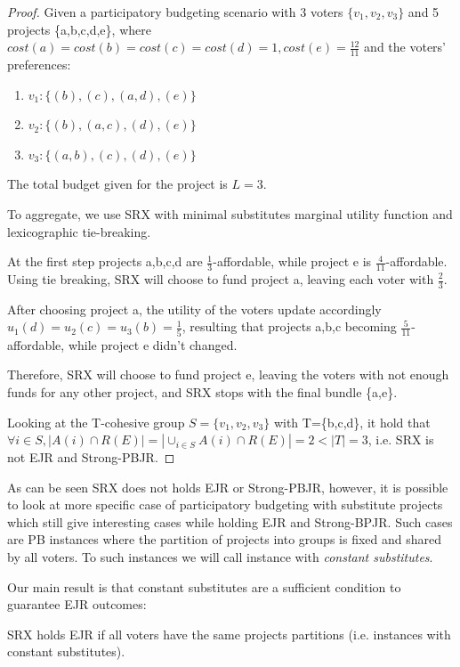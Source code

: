 \documentclass[runningheads]{llncs}
\begin{document}
\begin{proof}
Given a participatory budgeting scenario with 3 voters $\{v_1,v_2,v_3\}$ and 5 projects \{a,b,c,d,e\}, where $cost(a)=cost(b)=cost(c)=cost(d)=1, cost(e)=\frac{12}{11}$ and the voters' preferences:
\begin{enumerate}
    \item $v_1: \{(b),(c),(a,d),(e)\}$
    \item $v_2: \{(b),(a,c),(d),(e)\}$
    \item $v_3: \{(a,b),(c),(d),(e)\}$
\end{enumerate}

The total budget given for the project is $L=3$.

To aggregate, we use SRX with minimal substitutes marginal utility function and lexicographic tie-breaking.

At the first step projects a,b,c,d are $\frac{1}{3}$-affordable, while project e is $\frac{4}{11}$-affordable. Using tie breaking, SRX will choose to fund project a, leaving each voter with $\frac{2}{3}$.

After choosing project a, the utility of the voters update accordingly $u_1(d)=u_2(c)=u_3(b)=\frac{1}{5}$, resulting that projects a,b,c becoming $\frac{5}{11}$-affordable, while project e didn't changed.

Therefore, SRX will choose to fund project e, leaving the voters with not enough funds for any other project, and SRX stops with the final bundle \{a,e\}.

Looking at the T-cohesive group $S=\{v_1,v_2,v_3\}$ with T=\{b,c,d\}, it hold that $\forall i\in S, |A(i)\cap R(E)|=|\cup_{i\in S}A(i)\cap R(E)|=2<|T|=3$, i.e. SRX is not EJR and Strong-PBJR.
\end{proof}

As can be seen SRX does not holds EJR or Strong-PBJR, however, it is possible to look at more specific case of participatory budgeting with substitute projects which still give interesting cases while holding EJR and Strong-BPJR. Such cases are PB instances where the partition of projects into groups is fixed and shared by all voters. To such instances we will call instance with \emph{constant substitutes}.


Our main result is that constant substitutes are a sufficient condition to guarantee EJR outcomes:
\begin{theorem}\label{theorem:ejr}
SRX holds EJR if all voters have the same projects partitions (i.e. instances with constant substitutes).
\end{theorem}
\end{document}
